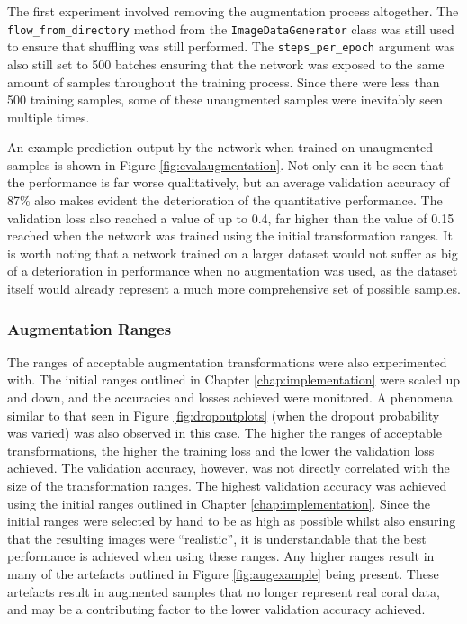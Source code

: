 The first experiment involved removing the augmentation process altogether. The \texttt{flow\_from\_directory} method from the \texttt{ImageDataGenerator} class was still used to ensure that shuffling was still performed. The \texttt{steps\_per\_epoch} argument was also still set to 500 batches ensuring that the network was exposed to the same amount of samples throughout the training process. Since there were less than 500 training samples, some of these unaugmented samples were inevitably seen multiple times.

An example prediction output by the network when trained on unaugmented samples is shown in Figure \ref{fig:evalaugmentation}. Not only can it be seen that the performance is far worse qualitatively, but an average validation accuracy of 87\% also makes evident the deterioration of the quantitative performance. The validation loss also reached a value of up to 0.4, far higher than the value of 0.15 reached when the network was trained using the initial transformation ranges. It is worth noting that a network trained on a larger dataset would not suffer as big of a deterioration in performance when no augmentation was used, as the dataset itself would already represent a much more comprehensive set of possible samples.

\subsubsection{Augmentation Ranges}

The ranges of acceptable augmentation transformations were also experimented with. The initial ranges outlined in Chapter \ref{chap:implementation} were scaled up and down, and the accuracies and losses achieved were monitored. A phenomena similar to that seen in Figure \ref{fig:dropoutplots} (when the dropout probability was varied) was also observed in this case. The higher the ranges of acceptable transformations, the higher the training loss and the lower the validation loss achieved. The validation accuracy, however, was not directly correlated with the size of the transformation ranges. The highest validation accuracy was achieved using the initial ranges outlined in Chapter \ref{chap:implementation}. Since the initial ranges were selected by hand to be as high as possible whilst also ensuring that the resulting images were ``realistic'', it is understandable that the best performance is achieved when using these ranges. Any higher ranges result in many of the artefacts outlined in Figure \ref{fig:augexample} being present. These artefacts result in augmented samples that no longer represent real coral data, and may be a contributing factor to the lower validation accuracy achieved.


